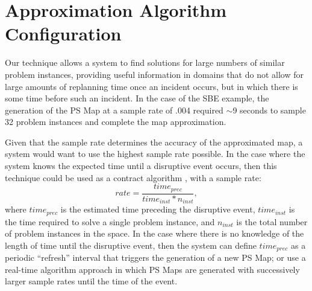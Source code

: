 \chapter{Approximation Algorithm Configuration}
\thispagestyle{plain}

\label{ch:configuration}
Our technique allows a system to find solutions for large numbers of similar problem instances, providing useful information in domains that do not allow for large amounts of replanning time once an incident occurs, but in which there is some time before such an incident.  In the case of the SBE example, the generation of the PS Map at a sample rate of .004 required $\sim$9 seconds to sample 32 problem instances and complete the map approximation.

Given that the sample rate determines the accuracy of the approximated map, a system would want to use the highest sample rate possible.  In the case where the system knows the expected time until a disruptive event occurs, then this technique could be used as a contract algorithm \cite{Zilberstein99real-timeproblem-solving}, with a sample rate:
\begin{equation*}
rate = \frac{time_{prec}}{time_{inst}*n_{inst}} ,
\end{equation*}
where $time_{prec}$ is the estimated time preceding the disruptive event, $time_{inst}$ is the time required to solve a single problem instance, and $n_{inst}$ is the total number of problem instances in the space.  In the case where there is no knowledge of the length of time until the disruptive event, then the system can define  $time_{prec}$ as a periodic ``refresh'' interval that triggers the generation of a new PS Map; or use a real-time algorithm approach in which PS Maps are generated with successively larger sample rates until the time of the event.
